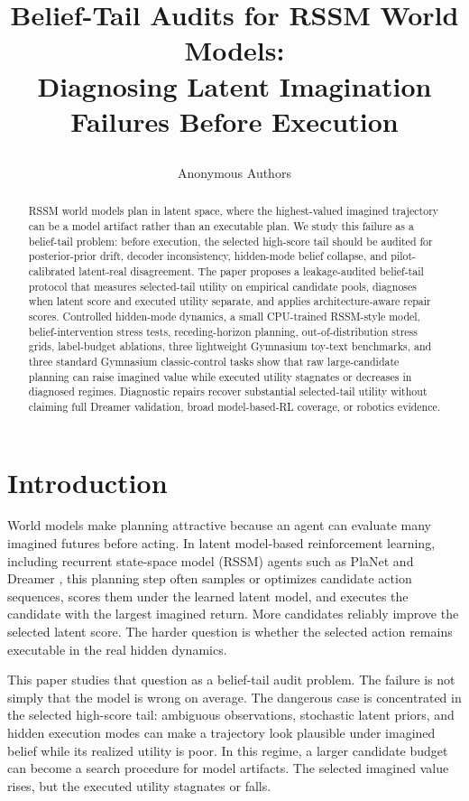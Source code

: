 \documentclass{article}
\title{\raggedright Belief-Tail Audits for RSSM World Models:\\Diagnosing Latent Imagination Failures Before Execution}
\author{Anonymous Authors}
\newcommand{\rssm}{RSSM}
\begin{document}
\maketitle

\begin{abstract}
RSSM world models plan in latent space, where the highest-valued imagined trajectory can be a model artifact rather than an executable plan. We study this failure as a belief-tail problem: before execution, the selected high-score tail should be audited for posterior-prior drift, decoder inconsistency, hidden-mode belief collapse, and pilot-calibrated latent-real disagreement. The paper proposes a leakage-audited belief-tail protocol that measures selected-tail utility on empirical candidate pools, diagnoses when latent score and executed utility separate, and applies architecture-aware repair scores. Controlled hidden-mode dynamics, a small CPU-trained \rssm-style model, belief-intervention stress tests, receding-horizon planning, out-of-distribution stress grids, label-budget ablations, three lightweight Gymnasium toy-text benchmarks, and three standard Gymnasium classic-control tasks show that raw large-candidate planning can raise imagined value while executed utility stagnates or decreases in diagnosed regimes. Diagnostic repairs recover substantial selected-tail utility without claiming full Dreamer validation, broad model-based-RL coverage, or robotics evidence.
\end{abstract}

\section{Introduction}

World models make planning attractive because an agent can evaluate many imagined futures before acting. In latent model-based reinforcement learning, including recurrent state-space model (\rssm) agents such as PlaNet and Dreamer \citep{hafner2019planet,hafner2020dreamer,hafner2021dreamerv2,hafner2023dreamerv3}, this planning step often samples or optimizes candidate action sequences, scores them under the learned latent model, and executes the candidate with the largest imagined return. More candidates reliably improve the selected latent score. The harder question is whether the selected action remains executable in the real hidden dynamics.

This paper studies that question as a belief-tail audit problem. The failure is not simply that the model is wrong on average. The dangerous case is concentrated in the selected high-score tail: ambiguous observations, stochastic latent priors, and hidden execution modes can make a trajectory look plausible under imagined belief while its realized utility is poor. In this regime, a larger candidate budget can become a search procedure for model artifacts. The selected imagined value rises, but the executed utility stagnates or falls.
\end{document}
